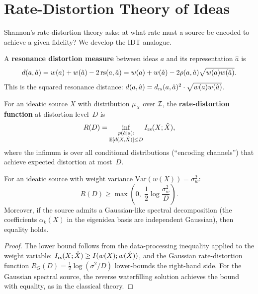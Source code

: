 \section{Rate-Distortion Theory of Ideas}
\label{sec:rate-distortion}

Shannon's rate-distortion theory asks: at what rate must a source be
encoded to achieve a given fidelity?  We develop the IDT analogue.

\begin{definition}
\label{def:distortion}
A \textbf{resonance distortion measure} between ideas $a$ and its
representation $\hat{a}$ is
\[
  d(a, \hat{a}) = w(a) + w(\hat{a}) - 2\,\mathrm{rs}(a, \hat{a})
  = w(a) + w(\hat{a}) - 2\rho(a,\hat{a})\sqrt{w(a)w(\hat{a})}.
\]
This is the squared resonance distance: $d(a,\hat{a}) = d_{\mathrm{rs}}(a,\hat{a})^2
\cdot \sqrt{w(a)w(\hat{a})}$.
\end{definition}

\begin{definition}
\label{def:rate-distortion}
For an ideatic source $X$ with distribution $\mu_X$ over $\mathcal{I}$, the
\textbf{rate-distortion function} at distortion level~$D$ is
\[
  R(D) = \inf_{\substack{p(\hat{a} \mid a) :\\
  \mathbb{E}[d(X,\hat{X})] \le D}}
  I_{\mathrm{rs}}(X; \hat{X}),
\]
where the infimum is over all conditional distributions (``encoding
channels'') that achieve expected distortion at most~$D$.
\end{definition}

\begin{theorem}
\label{thm:rate-distortion}
For an ideatic source with weight variance
$\mathrm{Var}(w(X)) = \sigma_w^2$:
\[
  R(D) \ge \max\left(0,\; \frac{1}{2}\log\frac{\sigma_w^2}{D}\right).
\]
Moreover, if the source admits a Gaussian-like spectral decomposition
(the coefficients $\alpha_k(X)$ in the eigenidea basis are independent
Gaussian), then equality holds.
\end{theorem}

\begin{proof}
The lower bound follows from the data-processing inequality applied to
the weight variable: $I_{\mathrm{rs}}(X;\hat{X}) \ge I(w(X); w(\hat{X}))$,
and the Gaussian rate-distortion function $R_G(D) = \frac{1}{2}
\log(\sigma^2/D)$ lower-bounds the right-hand side.  For the Gaussian
spectral source, the reverse waterfilling solution achieves the bound
with equality, as in the classical theory.
\end{proof}

